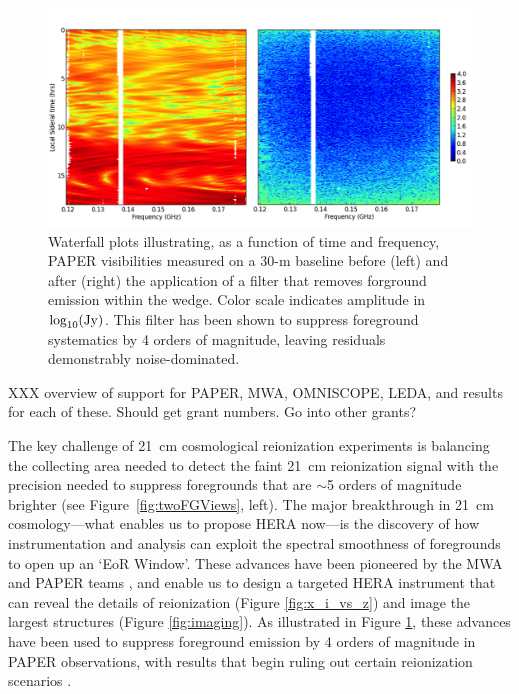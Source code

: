 \documentclass[preprint]{aastex}
\begin{document}
\begin{figure}[t]\centering
\includegraphics[width=6in]{plots/waterfall_filtered.png}
\caption{\small 
Waterfall plots illustrating, as a function of time and frequency, PAPER visibilities
measured on a 30-m baseline before (left) and after (right) the application of a 
filter that removes forground emission within the wedge.  Color scale indicates amplitude in $\log_{10}({\rm Jy})$.
This filter has been shown to suppress
foreground systematics by 4 orders of magnitude, leaving residuals demonstrably noise-dominated.
}\label{fig:waterfall} \end{figure}

XXX overview of support for PAPER, MWA, OMNISCOPE, LEDA, and results for each of these.  Should get grant numbers.
Go into other grants?

The key challenge of 21~cm cosmological reionization experiments is 
balancing the collecting area needed to detect the faint 21~cm reionization signal
with the precision needed to suppress
foregrounds that are $\sim$5 orders of magnitude brighter (see Figure~\ref{fig:twoFGViews}, left).
The major breakthrough in 21~cm cosmology---what enables us to propose HERA now---is 
the discovery of how 
instrumentation and analysis can exploit the 
spectral smoothness of foregrounds
to open up an `EoR Window'.  These advances have been pioneered by the MWA and PAPER teams \citep{morales_et_al2012,parsons_et_al2012b,vedantham_2012,Datta_2010,hazelton_et_al2013,pober_et_al2013,parsons_et_al2013,dillon_et_al2013b}, and enable us to design a targeted HERA instrument that can reveal the details of reionization (Figure \ref{fig:x_i_vs_z}) and image the largest structures (Figure \ref{fig:imaging}).
As illustrated in Figure \ref{fig:waterfall}, these advances have been used to suppress foreground emission by 4
orders of magnitude in PAPER observations,
with results that begin ruling out certain reionization scenarios
\citep{parsons_et_al2013}.
\end{document}
